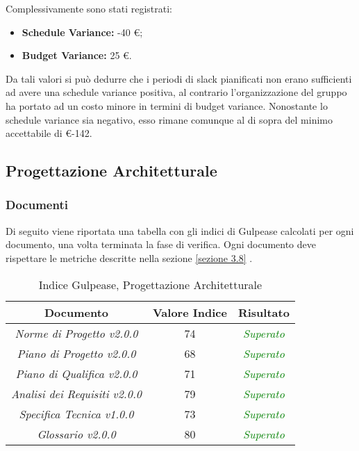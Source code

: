 \noindent Complessivamente sono stati registrati:
\begin{itemize}
	\item \textbf{Schedule Variance:} -40 \euro;
	\item \textbf{Budget Variance:} 25 \euro.
\end{itemize}

\noindent Da tali valori si può dedurre che i periodi di slack pianificati non erano sufficienti ad avere una schedule variance positiva, al contrario l'organizzazione del gruppo ha portato ad un costo minore in termini di budget variance. Nonostante lo schedule variance sia negativo, esso rimane comunque al di sopra del minimo accettabile di \euro -142.

\newpage

\subsection{Progettazione Architetturale}
\subsubsection{Documenti}
\label{appendice 3}

Di seguito viene riportata una tabella con gli indici di Gulpease calcolati per ogni documento, una volta terminata la fase di verifica. Ogni documento deve rispettare le metriche descritte nella sezione \ref{sezione 3.8} .\\

\hspace{1cm}

\begin{table}[h]
	\begin{tabular}{|c|c|c|}
		\hline 
		\textbf{Documento} & \textbf{Valore Indice} & \textbf{Risultato} \\ 
		\hline
		\textit{Norme di Progetto v2.0.0} & 74 & \textcolor{green}{\textit{Superato}} \\  
		\textit{Piano di Progetto v2.0.0} & 68 & \textcolor{green}{\textit{Superato}} \\ 
		\textit{Piano di Qualifica v2.0.0} & 71 & \textcolor{green}{\textit{Superato}} \\ 
		\textit{Analisi dei Requisiti v2.0.0} & 79 & \textcolor{green}{\textit{Superato}} \\
		\textit{Specifica Tecnica v1.0.0} & 73 & \textcolor{green}{\textit{Superato}} \\ 
		\textit{Glossario v2.0.0} & 80 & \textcolor{green}{\textit{Superato}} \\ 
		\hline 
\end{tabular}
\caption{Indice Gulpease, Progettazione Architetturale}
\end{table}

